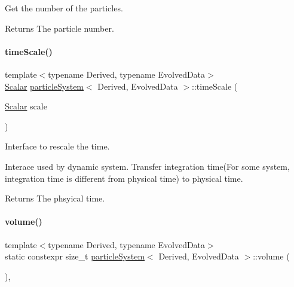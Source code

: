 Get the number of the particles. 

\begin{DoxyReturn}{Returns}
The particle number. 
\end{DoxyReturn}
\mbox{\label{classparticle_system_a973f0cdc8c8ab21c65e57b8729207551}} 
\paragraph{\texorpdfstring{time\+Scale()}{timeScale()}}
{\footnotesize\ttfamily template$<$typename Derived, typename Evolved\+Data$>$ \\
\mbox{\hyperlink{classparticle_system_a28e49da72c0ca5786d0611e6128a8994}{Scalar}} \mbox{\hyperlink{classparticle_system}{particle\+System}}$<$ Derived, Evolved\+Data $>$\+::time\+Scale (\begin{DoxyParamCaption}\item[{\mbox{\hyperlink{classparticle_system_a28e49da72c0ca5786d0611e6128a8994}{Scalar}}}]{scale }\end{DoxyParamCaption})\hspace{0.3cm}{\ttfamily [inline]}}



Interface to rescale the time. 

Interace used by dynamic system. Transfer integration time(For some system, integration time is different from physical time) to physical time. \begin{DoxyReturn}{Returns}
The phsyical time. 
\end{DoxyReturn}
\mbox{\label{classparticle_system_aac9e6701e4486c89b508a2508b77089b}} 
\paragraph{\texorpdfstring{volume()}{volume()}}
{\footnotesize\ttfamily template$<$typename Derived, typename Evolved\+Data$>$ \\
static constexpr size\+\_\+t \mbox{\hyperlink{classparticle_system}{particle\+System}}$<$ Derived, Evolved\+Data $>$\+::volume (\begin{DoxyParamCaption}{ }\end{DoxyParamCaption})\hspace{0.3cm}{\ttfamily [inline]}, {\ttfamily [static]}}



